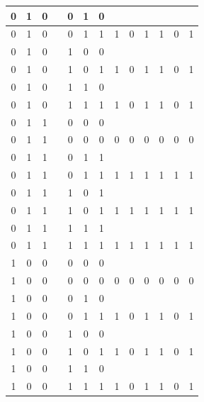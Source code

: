 \begin{table}[!tb]
\begin{tabular}{|c|c|c|c|c|c|c|c|c|c|c|c|c|}
        \rowcolor{yellow!40} 0 & 1 & 0 &  & 0 & 1 & 0 &  &  &  &  &  &  \\ \hline
        \rowcolor{yellow!40} 0 & 1 & 0 &  & 0 & 1 & 1 & 1 & 0 & 1 & 1 & 0 & 1 \\ \hline
        \rowcolor{gray!40} 0 & 1 & 0 &  & 1 & 0 & 0 &  &  &  &  &  &  \\ \hline
        \rowcolor{gray!40} 0 & 1 & 0 &  & 1 & 0 & 1 & 1 & 0 & 1 & 1 & 0 & 1 \\ \hline
        \rowcolor{blue!40} 0 & 1 & 0 &  & 1 & 1 & 0 &  &  &  &  &  &  \\ \hline
        \rowcolor{blue!40} 0 & 1 & 0 &  & 1 & 1 & 1 & 1 & 0 & 1 & 1 & 0 & 1 \\ \hline
        \rowcolor{red!40} 0 & 1 & 1 &  & 0 & 0 & 0 &  &  &  &  &  &  \\ \hline
        \rowcolor{red!40} 0 & 1 & 1 &  & 0 & 0 & 0 & 0 & 0 & 0 & 0 & 0 & 0 \\ \hline
        \rowcolor{green!40} 0 & 1 & 1 &  & 0 & 1 & 1 &  &  &  &  &  &  \\ \hline
        \rowcolor{green!40} 0 & 1 & 1 &  & 0 & 1 & 1 & 1 & 1 & 1 & 1 & 1 & 1 \\ \hline
        \rowcolor{yellow!40} 0 & 1 & 1 &  & 1 & 0 & 1 &  &  &  &  &  &  \\ \hline
        \rowcolor{yellow!40} 0 & 1 & 1 &  & 1 & 0 & 1 & 1 & 1 & 1 & 1 & 1 & 1 \\ \hline
        \rowcolor{gray!40} 0 & 1 & 1 &  & 1 & 1 & 1 &  &  &  &  &  &  \\ \hline
        \rowcolor{gray!40} 0 & 1 & 1 &  & 1 & 1 & 1 & 1 & 1 & 1 & 1 & 1 & 1 \\ \hline
        \rowcolor{blue!40} 1 & 0 & 0 &  & 0 & 0 & 0 &  &  &  &  &  &  \\ \hline
        \rowcolor{blue!40} 1 & 0 & 0 &  & 0 & 0 & 0 & 0 & 0 & 0 & 0 & 0 & 0 \\ \hline
        \rowcolor{red!40} 1 & 0 & 0 &  & 0 & 1 & 0 &  &  &  &  &  &  \\ \hline
        \rowcolor{red!40} 1 & 0 & 0 &  & 0 & 1 & 1 & 1 & 0 & 1 & 1 & 0 & 1 \\ \hline
        \rowcolor{green!40} 1 & 0 & 0 &  & 1 & 0 & 0 &  &  &  &  &  &  \\ \hline
        \rowcolor{green!40} 1 & 0 & 0 &  & 1 & 0 & 1 & 1 & 0 & 1 & 1 & 0 & 1 \\ \hline
        \rowcolor{yellow!40} 1 & 0 & 0 &  & 1 & 1 & 0 &  &  &  &  &  &  \\ \hline
        \rowcolor{yellow!40} 1 & 0 & 0 &  & 1 & 1 & 1 & 1 & 0 & 1 & 1 & 0 & 1 \\ \hline

\end{tabular}
\end{table}
